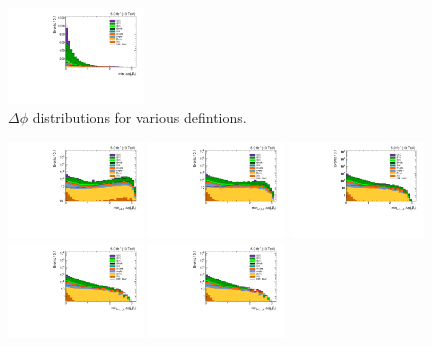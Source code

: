 \begin{figure}[htbp]
  \includegraphics[width=0.32\textwidth]{figures/hadronic-incl-dphijetmet.pdf}
  \caption{$\Delta\phi$ distributions for various defintions.}
  \label{fig:hadronic_dphijetmet}
\end{figure}

\begin{figure}[htbp]
  \centering
  \includegraphics[width=0.32\textwidth]{figures/hadronic-incl-dphijetmet2log.pdf}
  \includegraphics[width=0.32\textwidth]{figures/hadronic-incl-dphijetmet3log.pdf}
  \includegraphics[width=0.32\textwidth]{figures/hadronic-incl-dphijetmet4log.pdf} \\
  \includegraphics[width=0.32\textwidth]{figures/hadronic-incl-dphijetmet5log.pdf}
  \includegraphics[width=0.32\textwidth]{figures/hadronic-incl-dphijetmet6log.pdf}

\end{figure}
